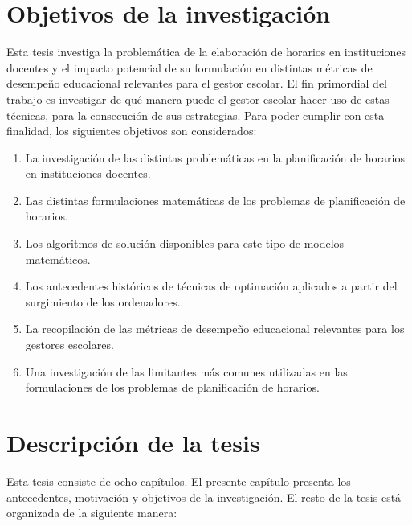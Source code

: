\documentclass[draft,12pt,headsepline,footsepline,paper=letter]{scrreprt}
\begin{document}
\section{Objetivos de la investigación}

Esta tesis investiga la problemática de la elaboración de horarios en instituciones docentes y el impacto potencial de su formulación en distintas métricas de desempeño educacional relevantes para el gestor escolar. 
El fin primordial del trabajo es investigar de qué manera puede el gestor escolar hacer uso de estas técnicas, para la consecución de sus estrategias.
Para poder cumplir con esta finalidad, los siguientes objetivos son considerados:
\begin{enumerate}[1]
\item La investigación de las distintas problemáticas en la planificación de horarios en instituciones docentes.
\item Las distintas formulaciones matemáticas de los problemas de planificación de horarios.
\item Los algoritmos de solución disponibles para este tipo de modelos matemáticos.
\item Los antecedentes históricos de técnicas de optimación aplicados a partir del surgimiento de los ordenadores.
\item La recopilación de las métricas de desempeño educacional relevantes para los gestores escolares.
\item Una investigación de las limitantes más comunes utilizadas en las formulaciones de los problemas de planificación de horarios.
\end{enumerate}

\section{Descripción de la tesis}

Esta tesis consiste de ocho capítulos. El presente capítulo presenta los antecedentes, motivación y objetivos de la investigación. El resto de la tesis está organizada de la siguiente manera:
\end{document}
